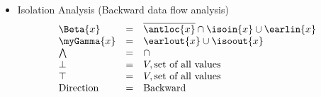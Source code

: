 \begin{itemize}
\item Isolation Analysis (Backward data flow analysis)
\begin{equation}
\begin{array}{l c l}
\Beta{x}      &=& \overline{\antloc{x}} \cap \isoin{x} \cup \earlin{x}     \\     
\myGamma{x}   &=& \earlout{x} \cup \isoout{x} \\
\bigwedge     &=&  \cap \\
\bot          &=& V, \text{set of all values} \\
\top          &=& V, \text{set of all values} \\
\text{Direction}    &=& \text{Backward}
\end{array}
\end{equation}

\end{itemize}
